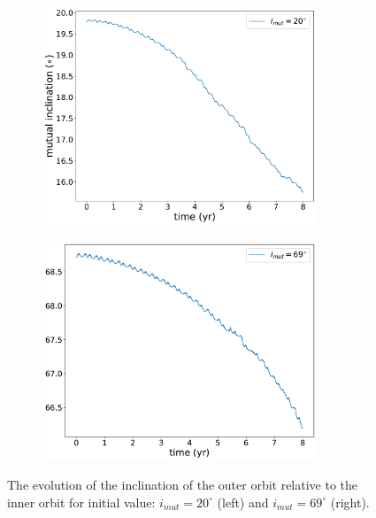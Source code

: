 \begin{figure}[H]
    \centering
    \begin{subfigure}{.5\textwidth}
    \centering
    \includegraphics[width=0.9\textwidth]{Thesis/graphs/inclination_case/inc_20.pdf}
    \end{subfigure}%
    \begin{subfigure}{.5\textwidth}
    \centering
    \includegraphics[width=0.9\textwidth]{Thesis/graphs/inclination_case/inc_69.pdf}
    \end{subfigure}
    \caption{ The evolution of the inclination of the outer orbit relative to the inner orbit for initial value: $i_{mut}=20^{\circ}$ (left) and $i_{mut}=69^{\circ}$ (right).}
    \label{fig:mutual_inclination}
\end{figure}

